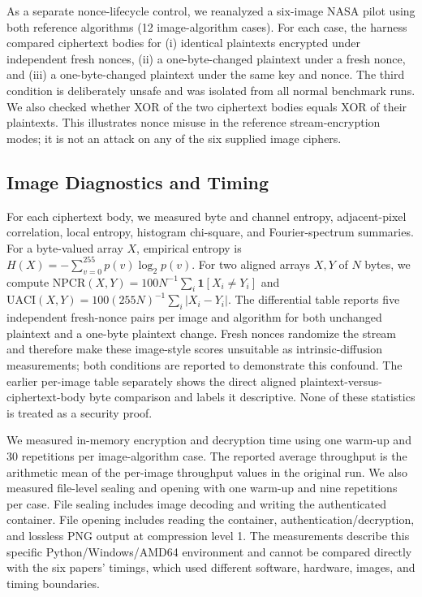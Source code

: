 \documentclass[letterpaper,journal]{IEEEtran}
\begin{document}
As a separate nonce-lifecycle control, we reanalyzed a six-image NASA pilot using both reference algorithms (12 image-algorithm cases). For each case, the harness compared ciphertext bodies for (i) identical plaintexts encrypted under independent fresh nonces, (ii) a one-byte-changed plaintext under a fresh nonce, and (iii) a one-byte-changed plaintext under the same key and nonce. The third condition is deliberately unsafe and was isolated from all normal benchmark runs. We also checked whether XOR of the two ciphertext bodies equals XOR of their plaintexts. This illustrates nonce misuse in the reference stream-encryption modes; it is not an attack on any of the six supplied image ciphers.

\subsection{Image Diagnostics and Timing}
For each ciphertext body, we measured byte and channel entropy, adjacent-pixel correlation, local entropy, histogram chi-square, and Fourier-spectrum summaries. For a byte-valued array $X$, empirical entropy is $H(X)=-\sum_{v=0}^{255}p(v)\log_2p(v)$. For two aligned arrays $X,Y$ of $N$ bytes, we compute $\mathrm{NPCR}(X,Y)=100N^{-1}\sum_i\mathbf{1}[X_i\ne Y_i]$ and $\mathrm{UACI}(X,Y)=100(255N)^{-1}\sum_i|X_i-Y_i|$. The differential table reports five independent fresh-nonce pairs per image and algorithm for both unchanged plaintext and a one-byte plaintext change. Fresh nonces randomize the stream and therefore make these image-style scores unsuitable as intrinsic-diffusion measurements; both conditions are reported to demonstrate this confound. The earlier per-image table separately shows the direct aligned plaintext-versus-ciphertext-body byte comparison and labels it descriptive. None of these statistics is treated as a security proof.

We measured in-memory encryption and decryption time using one warm-up and 30 repetitions per image-algorithm case. The reported average throughput is the arithmetic mean of the per-image throughput values in the original run. We also measured file-level sealing and opening with one warm-up and nine repetitions per case. File sealing includes image decoding and writing the authenticated container. File opening includes reading the container, authentication/decryption, and lossless PNG output at compression level 1. The measurements describe this specific Python/Windows/AMD64 environment and cannot be compared directly with the six papers' timings, which used different software, hardware, images, and timing boundaries.
\end{document}
